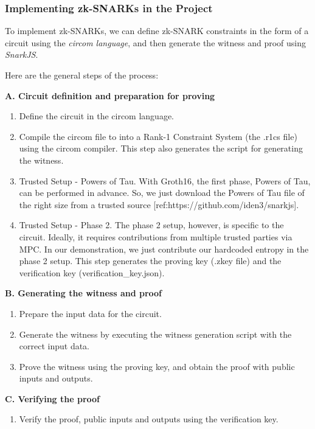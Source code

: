 \documentclass[
]{report}
\providecommand{\tightlist}{%
  \setlength{\itemsep}{0pt}\setlength{\parskip}{0pt}}
\begin{document}
\subsubsection{Implementing zk-SNARKs in the Project}

To implement zk-SNARKs, we can define zk-SNARK constraints in the form
of a circuit using the \emph{circom language}, and then generate the
witness and proof using \emph{SnarkJS}.

Here are the general steps of the process:

\textbf{A. Circuit definition and preparation for proving}

\begin{enumerate}
\def\labelenumi{\arabic{enumi}.}
\tightlist
\item
  Define the circuit in the circom language.
\item
  Compile the circom file to into a Rank-1 Constraint System (the .r1cs
  file) using the circom compiler. This step also generates the script
  for generating the witness.
\item
  Trusted Setup - Powers of Tau. With Groth16, the first phase, Powers
  of Tau, can be performed in advance. So, we just download the Powers
  of Tau file of the right size from a trusted source
  {[}ref:https://github.com/iden3/snarkjs{]}.
\item
  Trusted Setup - Phase 2. The phase 2 setup, however, is specific to
  the circuit. Ideally, it requires contributions from multiple trusted
  parties via MPC. In our demonstration, we just contribute our
  hardcoded entropy in the phase 2 setup. This step generates the
  proving key (.zkey file) and the verification key
  (verification\_key.json).
\end{enumerate}

\textbf{B. Generating the witness and proof}

\begin{enumerate}
\def\labelenumi{\arabic{enumi}.}
\tightlist
\item
  Prepare the input data for the circuit.
\item
  Generate the witness by executing the witness generation script with
  the correct input data.
\item
  Prove the witness using the proving key, and obtain the proof with
  public inputs and outputs.
\end{enumerate}

\textbf{C. Verifying the proof}

\begin{enumerate}
\def\labelenumi{\arabic{enumi}.}
\tightlist
\item
  Verify the proof, public inputs and outputs using the verification
  key.
\end{enumerate}
\end{document}
